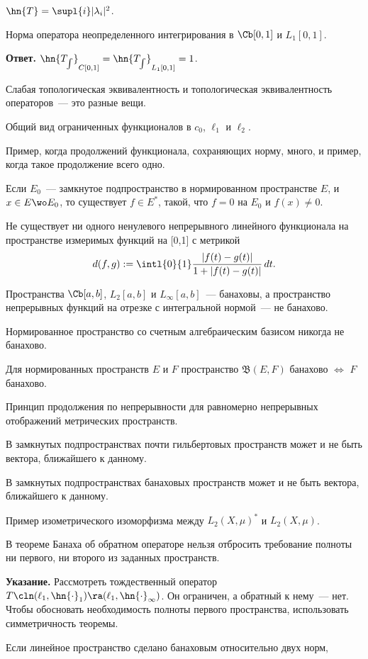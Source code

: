 \documentclass[a4paper]{article}
\def\apoint{\par\textbf{Указание.} }
\def\answer{\par\textbf{Ответ.} }
\begin{document}
\begin{nums}{-1}
$\hn{T}=\supl{i} |\lambda_i|^2$.
\item Норма оператора неопределенного интегрирования в $\Cb[0,1]$ и $L_1[0,1]$.
\answer $\hn{T_{\int}}_{C[0,1]}=\hn{T_{\int}}_{L_1[0,1]}=1$.
\item Слабая топологическая эквивалентность и топологическая эквивалентность операторов~--- это разные вещи.
\item Общий вид ограниченных функционалов в $c_0$, $\ell_1$ и $\ell_2$.
\item Пример, когда продолжений функционала, сохраняющих норму, много, и пример, когда такое продолжение всего одно.
\item Если $E_0$~--- замкнутое подпространство в нормированном пространстве $E$, и $x\in E\wo E_0$, то существует
$f\in E^*$, такой, что $f=0$ на $E_0$ и $f(x)\ne0$.
\item Не существует ни одного ненулевого непрерывного линейного
функционала на пространстве измеримых функций на [0,1] с метрикой
$$d(f,g)\mathrel{:=}\intl{0}{1}\frac{|f(t)-g(t)|}{1+|f(t)-g(t)|}\,dt.$$
\item Пространства $\Cb[a,b]$, $L_2[a,b]$ и $L_\infty[a,b]$~--- банаховы, а пространство непрерывных
функций на отрезке с интегральной нормой~--- не банахово.
\item Нормированное пространство со счетным алгебраическим базисом никогда не банахово.
\item Для нормированных пространств $E$ и $F$ пространство $\mathfrak{B}(E,F)$ банахово $\iff$ $F$ банахово.
\item Принцип продолжения по непрерывности для равномерно непрерывных отображений метрических пространств.
\item В замкнутых подпространствах почти гильбертовых пространств может и не быть вектора, ближайшего к данному.
\item В замкнутых подпространствах банаховых пространств может и не быть вектора, ближайшего к данному.
\item Пример изометрического изоморфизма между $L_2(X,\mu)^*$ и $L_2(X,\mu)$.
\item В теореме Банаха об обратном операторе нельзя отбросить требование полноты ни первого, ни второго
из заданных пространств. \apoint Рассмотреть тождественный оператор
$T\cln(\ell_1,\hn{\cdot}_1)\ra(\ell_1,\hn{\cdot}_\infty)$. Он ограничен, а обратный к нему~--- нет.
Чтобы обосновать необходимость полноты первого пространства, использовать симметричность теоремы.
\item Если линейное пространство сделано банаховым относительно двух норм,

\end{nums}
\end{document}

